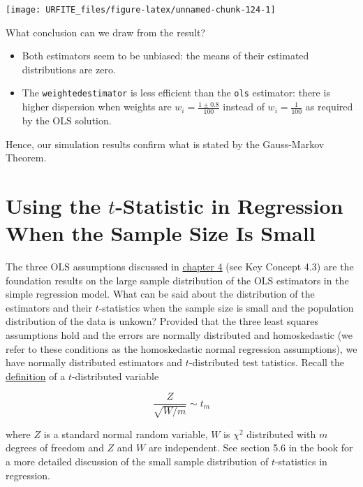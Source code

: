 \documentclass[]{book}
\providecommand{\tightlist}{%
  \setlength{\itemsep}{0pt}\setlength{\parskip}{0pt}}
\theoremstyle{definition}
\theoremstyle{definition}
\theoremstyle{definition}
\theoremstyle{remark}
\begin{document}
\begin{center}\texttt{[image: URFITE\_files/figure-latex/unnamed-chunk-124-1]} \end{center}

What conclusion can we draw from the result?

\begin{itemize}
\tightlist
\item
  Both estimators seem to be unbiased: the means of their estimated
  distributions are zero.
\item
  The \texttt{weightedestimator} is less efficient than the \texttt{ols}
  estimator: there is higher dispersion when weights are
  \(w_i = \frac{1 \pm 0.8}{100}\) instead of \(w_i=\frac{1}{100}\) as
  required by the OLS solution.
\end{itemize}

Hence, our simulation results confirm what is stated by the Gauss-Markov
Theorem.

\section{\texorpdfstring{Using the \(t\)-Statistic in Regression When
the Sample Size Is
Small}{Using the t-Statistic in Regression When the Sample Size Is Small}}\label{using-the-t-statistic-in-regression-when-the-sample-size-is-small}

The three OLS assumptions discussed in \protect\hyperlink{lrwor}{chapter
4} (see Key Concept 4.3) are the foundation results on the large sample
distribution of the OLS estimators in the simple regression model. What
can be said about the distribution of the estimators and their
\(t\)-statistics when the sample size is small and the population
distribution of the data is unkown? Provided that the three least
squares assumptions hold and the errors are normally distributed and
homoskedastic (we refer to these conditions as the homoskedastic normal
regression assumptions), we have normally distributed estimators and
\(t\)-distributed test tatistics. Recall the
\protect\hyperlink{thetdist}{definition} of a \(t\)-distributed variable

\[ \frac{Z}{\sqrt{W/m}} \sim t_m\]

where \(Z\) is a standard normal random variable, \(W\) is \(\chi^2\)
distributed with \(m\) degrees of freedom and \(Z\) and \(W\) are
independent. See section 5.6 in the book for a more detailed discussion
of the small sample distribution of \(t\)-statistics in regression.
\end{document}
